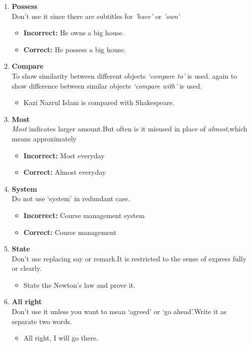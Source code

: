 \documentclass{report}
\begin{document}
\begin{enumerate}
	\item \textbf{Possess}\\
	Don’t use it since there are subtitles for \textit{'have'} or \textit{'own'}
	\begin{itemize}
		\item \textbf{Incorrect: } He owns a big house.
		\item \textbf{Correct:} He possess a big house.
	\end{itemize}

	\item \textbf{Compare}\\
	To show similarity between different objects \textit{‘compare to’} is used. again to show difference between similar objects \textit{‘compare with’} is used.
	\begin{itemize}
		\item Kazi Nazrul Islam is compared with Shakespeare.
	\end{itemize}

	\item \textbf{Most}\\
	\textit{Most} indicates larger amount.But often is it misused in place of \textit{almost},which
	means approximately
	\begin{itemize}
		\item \textbf{Incorrect: } Most everyday
		\item \textbf{Correct:} Almost everyday
	\end{itemize}
	
	\item \textbf{System}\\
	Do not use ‘system’ in redundant case.
	\begin{itemize}
		\item \textbf{Incorrect: } Course management system
		\item \textbf{Correct:} Course management
	\end{itemize}

	\item \textbf{State}\\
	Don’t use replacing say or remark.It is restricted to the sense of express fully or clearly.
	\begin{itemize}
		\item State the Newton’s law and prove it.
	\end{itemize}
	\item \textbf{All right}\\
	Don’t use it unless you want to mean ‘agreed’ or ‘go ahead’.Write it as separate two words.
	\begin{itemize}
		\item All right, I will go there.
	\end{itemize}
\end{enumerate}
\end{document}
